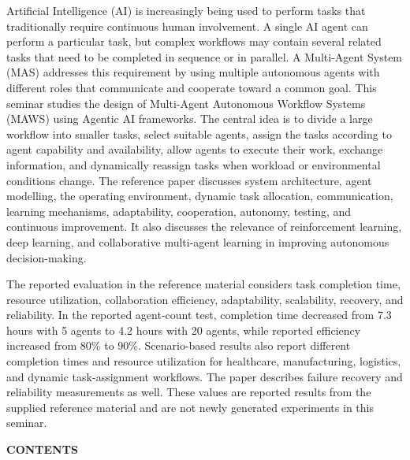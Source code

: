 \documentclass[12pt,letterpaper]{article}
\newcommand{\bodytextstyle}{\fontsize{11.3pt}{25.8pt}\selectfont}
\begin{document}
\bodytextstyle
Artificial Intelligence (AI) is increasingly being used to perform tasks that traditionally require continuous human involvement. A single AI agent can perform a particular task, but complex workflows may contain several related tasks that need to be completed in sequence or in parallel. A Multi-Agent System (MAS) addresses this requirement by using multiple autonomous agents with different roles that communicate and cooperate toward a common goal. This seminar studies the design of Multi-Agent Autonomous Workflow Systems (MAWS) using Agentic AI frameworks. The central idea is to divide a large workflow into smaller tasks, select suitable agents, assign the tasks according to agent capability and availability, allow agents to execute their work, exchange information, and dynamically reassign tasks when workload or environmental conditions change. The reference paper discusses system architecture, agent modelling, the operating environment, dynamic task allocation, communication, learning mechanisms, adaptability, cooperation, autonomy, testing, and continuous improvement. It also discusses the relevance of reinforcement learning, deep learning, and collaborative multi-agent learning in improving autonomous decision-making.

The reported evaluation in the reference material considers task completion time, resource utilization, collaboration efficiency, adaptability, scalability, recovery, and reliability. In the reported agent-count test, completion time decreased from 7.3 hours with 5 agents to 4.2 hours with 20 agents, while reported efficiency increased from 80\% to 90\%. Scenario-based results also report different completion times and resource utilization for healthcare, manufacturing, logistics, and dynamic task-assignment workflows. The paper describes failure recovery and reliability measurements as well. These values are reported results from the supplied reference material and are not newly generated experiments in this seminar.
\newpage

\thispagestyle{empty}
\vspace*{-10pt}
{\centering\fontsize{13.2pt}{15pt}\selectfont\bfseries CONTENTS\par}
\vspace{8pt}
\end{document}
